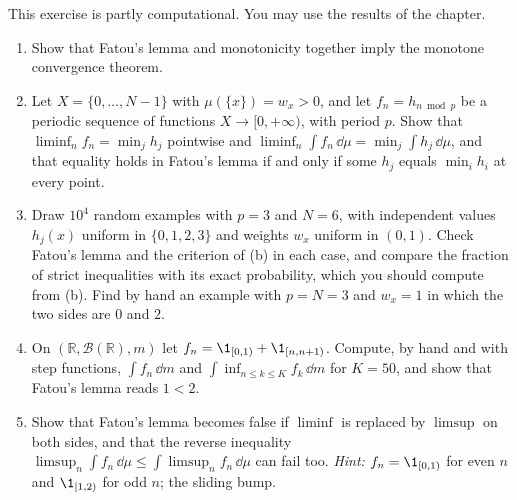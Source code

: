 \begin{exercise}\label{ex:in-fatou-strict}
\medium This exercise is partly computational. You may use the results of the chapter.
\begin{enumerate}[label=(\alph*)]
  \item Show that Fatou's lemma and monotonicity together imply the monotone convergence
    theorem.
  \item Let $X=\{0,\dots,N-1\}$ with $\mu(\{x\})=w_x>0$, and let $f_n=h_{n\bmod p}$ be a periodic
    sequence of functions $X\to[0,+\infty)$, with period $p$. Show that
    $\liminf_nf_n=\min_jh_j$ pointwise and $\liminf_n\int f_n\,\dd\mu=\min_j\int h_j\,\dd\mu$, and
    that equality holds in Fatou's lemma if and only if some $h_j$ equals $\min_ih_i$ at every
    point.
  \item Draw $10^4$ random examples with $p=3$ and $N=6$, with independent values $h_j(x)$
    uniform in $\{0,1,2,3\}$ and weights $w_x$ uniform in $(0,1)$. Check Fatou's lemma and the
    criterion of (b) in each case, and compare the fraction of strict inequalities with its
    exact probability, which you should compute from (b). Find by hand an example with $p=N=3$
    and $w_x=1$ in which the two sides are $0$ and $2$.
  \item On $(\mathbb R,\mathcal B(\mathbb R),m)$ let $f_n=\1_{[0,1)}+\1_{[n,n+1)}$. Compute, by hand
    and with step functions, $\int f_n\,\dd m$ and $\int\inf_{n\le k\le K}f_k\,\dd m$ for
    $K=50$, and show that Fatou's lemma reads $1<2$.
  \item Show that Fatou's lemma becomes false if $\liminf$ is replaced by $\limsup$ on both
    sides, and that the reverse inequality $\limsup_n\int f_n\,\dd\mu\le\int\limsup_nf_n\,\dd\mu$
    can fail too. \emph{Hint:} $f_n=\1_{[0,1)}$ for even $n$ and $\1_{[1,2)}$ for odd $n$; the
    sliding bump.
\end{enumerate}
\end{exercise}
